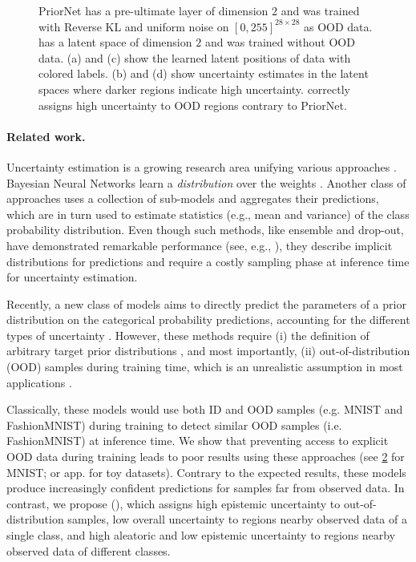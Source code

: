 \begin{figure}[ht!]
\begin{subfigure}[t]{0.23\columnwidth}
        \label{ours_visualization_unc}
    \end{subfigure}%
    \caption{PriorNet has a pre-ultimate layer of dimension $2$ and was trained with Reverse KL and uniform noise on $[0,255]^{28\times28}$ as OOD data. \PostNetacro has a latent space of dimension $2$ and was trained without OOD data. (a) and (c) show the learned latent positions of data with colored labels. (b) and (d) show uncertainty estimates in the latent spaces where darker regions indicate high uncertainty. \PostNetacro correctly assigns high uncertainty to OOD regions contrary to PriorNet.}
    \label{fig:mnist_2D_latent_space}
\end{figure}

\paragraph{Related work.} Uncertainty estimation is a growing research area unifying various approaches \cite{bayesian-networks, simple-baseline-uncertainty, practical_deep_bayesian_principles, Eswaran2017, ensembles, dropout}. Bayesian Neural Networks learn a \emph{distribution} over the weights \cite{bayesian-networks, simple-baseline-uncertainty, practical_deep_bayesian_principles}. Another class of approaches uses a collection of sub-models and aggregates their predictions, which are in turn used to estimate statistics (e.g., mean and variance) of the class probability distribution. Even though such methods, like ensemble and drop-out, have demonstrated remarkable performance (see, e.g., \cite{dataset-shift}), they describe implicit distributions for predictions and require a costly sampling phase at inference time for uncertainty estimation. 

Recently, a new class of models aims to directly predict the parameters of a prior distribution on the categorical probability predictions, accounting for the different types of uncertainty \cite{PriorNetworks, reverse-kl, sensoy2018, uceloss}. However, these methods require (i) the definition of arbitrary target prior distributions \cite{PriorNetworks, reverse-kl, sensoy2018}, and most importantly, (ii) out-of-distribution (OOD) samples during training time, which is an unrealistic assumption in most applications \cite{PriorNetworks, reverse-kl}.

Classically, these models would use both ID and OOD samples (e.g. MNIST and FashionMNIST) during training to detect similar OOD samples (i.e. FashionMNIST) at inference time. We show that preventing access to explicit OOD data during training leads to poor results using these approaches (see \cref{fig:mnist_2D_latent_space} for MNIST; or app. for toy datasets). Contrary to the expected results, these models produce increasingly confident predictions for samples far from observed data. In contrast, we propose \PostNet (\PostNetacro), which assigns high epistemic uncertainty to out-of-distribution samples, low overall uncertainty to regions nearby observed data of a single class, and high aleatoric and low epistemic uncertainty to regions nearby observed data of different classes.

